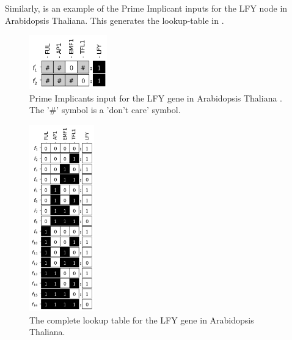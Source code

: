 \documentclass[letterpaper]{article}
\begin{document}
Similarly,  is an example of the Prime Implicant inputs for the LFY node in Arabidopsis Thaliana.
This generates the lookup-table in . 
\begin{figure}[h]
    \centering
    \includegraphics[width=0.3\textwidth]{thalianaLFY.png}
    \caption{Prime Implicants input \citep{CANA} for the LFY gene in Arabidopsis Thaliana \citep{thaliana}. The '\#' symbol is a 'don't care' symbol.}
    \label{fig:thaliana-LFY-input-PI}
\end{figure}

\begin{figure}[ht]
    \centering
    \includegraphics[width=0.25\textwidth]{thalianaLFYlookuptable.png}
    \caption{The complete lookup table for the LFY gene in Arabidopsis Thaliana.}
    \label{fig:thaliana-LFY-lookuptable}
\end{figure}
\end{document}
